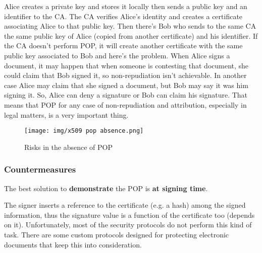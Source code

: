 Alice creates a private key and stores it locally then sends a public
key and an identifier to the CA. The CA verifies Alice’s identity and
creates a certificate associating Alice to that public key. Then
there’s Bob who sends to the same CA the same public key of Alice
(copied from another certificate) and his identifier. If the CA
doesn’t perform POP, it will create another certificate with the same
public key associated to Bob and here’s the problem. When Alice signs
a document, it may happen that when someone is contesting that
document, she could claim that Bob signed it, so non-repudiation isn't
achievable. In another case Alice may claim that she signed
a document, but Bob may say it was him signing it. So, Alice can deny
a signature or Bob can claim his signature. That means that POP for
any case of non-repudiation and attribution, especially in legal
matters, is a very important thing.

\begin{figure}[H]
  \centering
  \texttt{[image: img/x509 pop absence.png]}
  \label{fig:risks in the absence of POP}

  \caption{Risks in the absence of POP}
\end{figure}
\subsubsection{Countermeasures}
\begin{boxH}
  The best solution to \textbf{demonstrate} the POP is \textbf{at
  signing time}.
\end{boxH}
The signer inserts a reference to the certificate (e.g. a hash) among
the signed information, thus the signature value is a function of the
certificate too (depends on it).
Unfortunately, most of the security protocols do not perform this kind
of task. There are some custom protocols designed for protecting
electronic documents that keep this into consideration.\\

